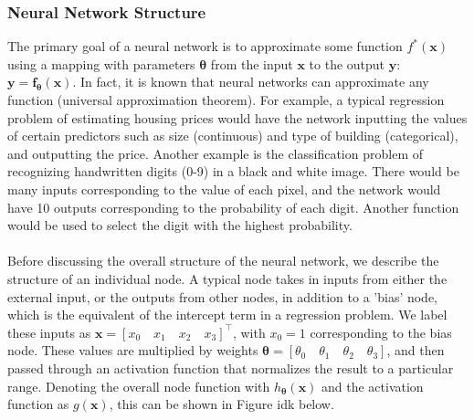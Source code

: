 \documentclass[a4paper,12pt]{article}
\numberwithin{equation}{section}
\begin{document}
\subsubsection{Neural Network Structure}
The primary goal of a neural network is to approximate some function $f^*(\textbf{x})$ using a mapping with parameters $\bm{\theta}$ from the input $\textbf{x}$ to the output $\textbf{y}$: $\textbf{y}=\textbf{f}_{\bm{\theta}}(\textbf{x})$. In fact, it is known that neural networks can approximate any function (universal approximation theorem). For example, a typical regression problem of estimating housing prices would have the network inputting the values of certain predictors such as size (continuous) and type of building (categorical), and outputting the price. Another example is the classification problem of recognizing handwritten digits (0-9) in a black and white image. There would be many inputs corresponding to the value of each pixel, and the network would have 10 outputs corresponding to the probability of each digit. Another function would be used to select the digit with the highest probability.\\
\\
Before discussing the overall structure of the neural network, we describe the structure of an individual node. A typical node takes in inputs from either the external input, or the outputs from other nodes, in addition to a 'bias' node, which is the equivalent of the intercept term in a regression problem. We label these inputs as $\textbf{x}=[x_0\quad x_1\quad x_2\quad x_3]^\top$, with $x_0=1$ corresponding to the bias node. These values are multiplied by weights $\bm{\theta}=[\theta_0\quad\theta_1\quad\theta_2\quad\theta_3]$, and then passed through an activation function that normalizes the result to a particular range. Denoting the overall node function with $h_{\bm{\theta}}(\textbf{x})$ and the activation function as $g(\bm{x})$, this can be shown in Figure idk below. \\
\end{document}
